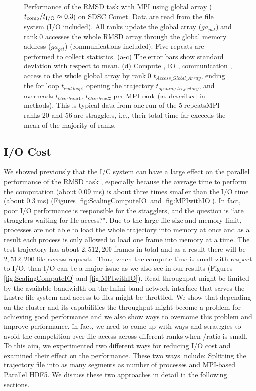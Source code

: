 \begin{figure}[ht!]
\caption{Performance of the RMSD task with MPI using global array (${t}_{\text{comp}}/{t}_{\text{I/O}} \approx 0.3$) on SDSC Comet.
Data are read from the file system (I/O included). All ranks update the global array ($ga_{put}$) and rank 0 accesses the whole RMSD array through the global memory address ($ga_{get}$) (communications included).
Five repeats are performed to collect statistics. (a-c) The error bars show standard deviation with respect to mean. 
(d) Compute \tcomp, IO \tIO, communication \tcomm, access to the whole global array by rank 0 $t_{Access\_Global\_Array}$, ending the for loop $t_{end\_loop}$, 
opening the trajectory $t_{opening\_trajectory}$, and overheads $t_{Overhead1}$, 
$t_{Overhead2}$ per MPI rank (as described in methods). This is typical data from one run of the 5 repeatsMPI ranks 20 and 56 are stragglers, i.e., 
their total time far exceeds the mean of the majority of ranks.}
\label{fig:MPIwithIO-ga4py}
\end{figure}

\subsection{I/O Cost}
\label{I/O}
We showed previously that the I/O system can have a large effect on the parallel performance of the RMSD task \cite{Khoshlessan:2017ab},
especially because the average time to perform the computation \tcomp (about 0.09 ms) is about three times smaller than the I/O time \tIO (about 0.3 ms) (Figures \ref{fig:ScalingComputeIO} and \ref{fig:MPIwithIO}). 
In fact, poor I/O performance is responsible for the stragglers, and the question is ``are stragglers waiting for file access?". 
Due to the large file size and memory limit, processes are not able to load the whole trajectory into memory at once and as a result each process is only allowed to load one frame into memory at a time.
The test trajectory has about $2,512,200$ frames in total and as a result there will be $2,512,200$ file access requests. 
Thus, when the compute time is small with respect to I/O, then I/O can be a major issue as we also see in our results (Figures \ref{fig:ScalingComputeIO} and \ref{fig:MPIwithIO}).    
Read throughput might be limited by the available bandwidth on the Infini-band network interface that serves the Lustre file system and access to files might be throttled.
We show that depending on the cluster and its capabilities the throughput might become a problem for achieving good performance and we also show ways to overcome this problem and improve performance.
In fact, we need to come up with ways and strategies to avoid the competition over file access across different ranks when \tcomp/\tIO ratio is small.
To this aim, we experimented two different ways for reducing I/O cost and examined their effect on the performance.
These two ways include: Splitting the trajectory file into as many segments as number of processes and MPI-based Parallel HDF5.
We discuss these two approaches in detail in the following sections.

